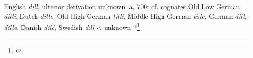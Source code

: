 \begin{etymology}\label{ety:dill}
English \textit{dill}, ulterior derivation unknown, a. 700; cf. cognates  Old Low German \textit{dilli}, Dutch \textit{dille}, Old High German \textit{tilli}, Middle High German \textit{tille}, German \textit{dill, dille}, Danish \textit{dild}, Swedish \textit{dill} 
< unknown \textit{*}\footnote{\textcite[dill]{oed}}
\end{etymology}
